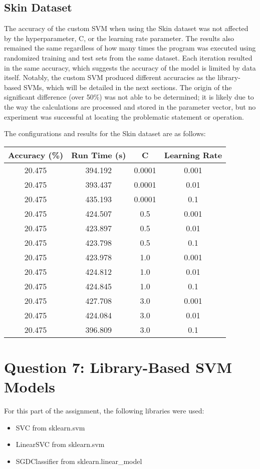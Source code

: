 \documentclass[letterpaper]{article}
\begin{document}
\subsection{Skin Dataset}
The accuracy of the custom SVM when using the Skin dataset was not affected by the hyperparameter, C, or the learning rate parameter. The results also remained the same regardless of how many times the program was executed using randomized training and test sets from the same dataset. Each iteration resulted in the same accuracy, which suggests the accuracy of the model is limited by data itself. Notably, the custom SVM produced different accuracies as the library-based SVMs, which will be detailed in the next sections. The origin of the significant difference (over 50\%) was not able to be determined; it is likely due to the way the calculations are processed and stored in the parameter vector, but no experiment was successful at locating the problematic statement or operation.

The configurations and results for the Skin dataset are as follows:
\begin{center}
\begin{tabular}{|c c c c|} 
 \hline
 Accuracy (\%) & Run Time (s) & C & Learning Rate \\
 \hline
  20.475 & 394.192 & 0.0001 & 0.001 \\
 \hline
  20.475 & 393.437 & 0.0001 & 0.01 \\
 \hline
  20.475 & 435.193 & 0.0001 & 0.1 \\
 \hline
  20.475 & 424.507 & 0.5 &  0.001 \\
 \hline
  20.475 & 423.897 & 0.5 &  0.01 \\
 \hline
  20.475 & 423.798 & 0.5 &  0.1 \\
 \hline
  20.475 & 423.978 & 1.0 &  0.001 \\
 \hline
  20.475 & 424.812 & 1.0 &  0.01 \\
 \hline
  20.475 & 424.845 & 1.0 &  0.1 \\
 \hline
  20.475 & 427.708 & 3.0 &  0.001 \\
 \hline
  20.475 & 424.084 & 3.0 &  0.01 \\
 \hline
  20.475 & 396.809 & 3.0 &  0.1 \\
 \hline
\end{tabular}
\end{center}

\section{Question 7: Library-Based SVM Models}
For this part of the assignment, the following libraries were used:
\begin{itemize}
    \item SVC from sklearn.svm
    \item LinearSVC from sklearn.svm
    \item SGDClassifier from sklearn.linear\_model
\end{itemize}
\end{document}
